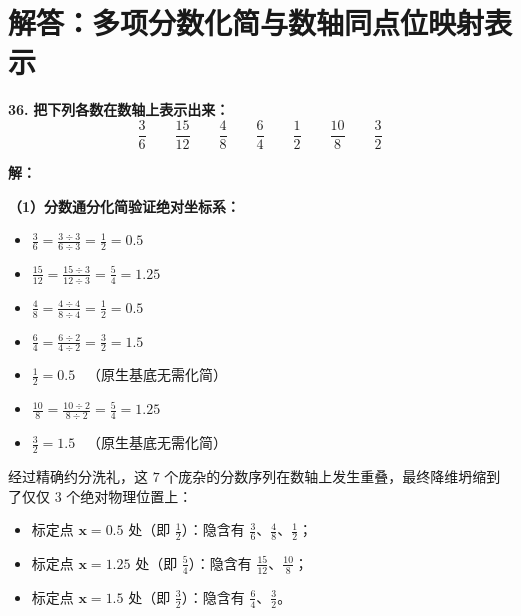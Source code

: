 \newpage



\newpage

\section{解答：多项分数化简与数轴同点位映射表示}

\vspace{0.6cm}

\textbf{\LARGE 36.} \textbf{把下列各数在数轴上表示出来：}
\[
\frac{3}{6} \qquad \frac{15}{12} \qquad \frac{4}{8} \qquad \frac{6}{4} \qquad \frac{1}{2} \qquad \frac{10}{8} \qquad \frac{3}{2}
\]

\vspace{0.4cm}
\textbf{解：}

\textbf{（1）分数通分化简验证绝对坐标系：}
\begin{itemize}
    \item $\displaystyle \frac{3}{6} = \frac{3 \div 3}{6 \div 3} = \frac{1}{2} = 0.5$
    \item $\displaystyle \frac{15}{12} = \frac{15 \div 3}{12 \div 3} = \frac{5}{4} = 1.25$
    \item $\displaystyle \frac{4}{8} = \frac{4 \div 4}{8 \div 4} = \frac{1}{2} = 0.5$
    \item $\displaystyle \frac{6}{4} = \frac{6 \div 2}{4 \div 2} = \frac{3}{2} = 1.5$
    \item $\displaystyle \frac{1}{2} = 0.5$ \ （原生基底无需化简）
    \item $\displaystyle \frac{10}{8} = \frac{10 \div 2}{8 \div 2} = \frac{5}{4} = 1.25$
    \item $\displaystyle \frac{3}{2} = 1.5$ \ （原生基底无需化简）
\end{itemize}

经过精确约分洗礼，这 $7$ 个庞杂的分数序列在数轴上发生重叠，最终降维坍缩到了仅仅 $3$ 个绝对物理位置上：
\begin{itemize}
    \item 标定点 $\boldsymbol{x=0.5}$ 处（即 $\frac{1}{2}$）：隐含有 $\displaystyle\frac{3}{6} \text{、} \frac{4}{8} \text{、} \frac{1}{2}$；
    \item 标定点 $\boldsymbol{x=1.25}$ 处（即 $\frac{5}{4}$）：隐含有 $\displaystyle\frac{15}{12} \text{、} \frac{10}{8}$；
    \item 标定点 $\boldsymbol{x=1.5}$ 处（即 $\frac{3}{2}$）：隐含有 $\displaystyle\frac{6}{4} \text{、} \frac{3}{2}$。
\end{itemize}

